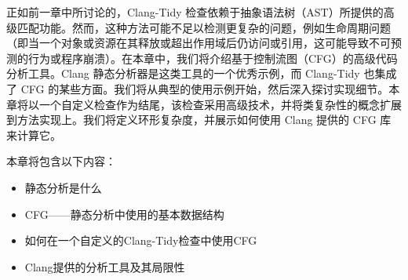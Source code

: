 
正如前一章中所讨论的，Clang-Tidy 检查依赖于抽象语法树（AST）所提供的高级匹配功能。然而，这种方法可能不足以检测更复杂的问题，例如生命周期问题（即当一个对象或资源在其释放或超出作用域后仍访问或引用，这可能导致不可预测的行为或程序崩溃）。在本章中，我们将介绍基于控制流图（CFG）的高级代码分析工具。Clang 静态分析器是这类工具的一个优秀示例，而 Clang-Tidy 也集成了 CFG 的某些方面。我们将从典型的使用示例开始，然后深入探讨实现细节。本章将以一个自定义检查作为结尾，该检查采用高级技术，并将类复杂性的概念扩展到方法实现上。我们将定义环形复杂度，并展示如何使用 Clang 提供的 CFG 库来计算它。

本章将包含以下内容：

\begin{itemize}
\item
静态分析是什么

\item
CFG——静态分析中使用的基本数据结构

\item
如何在一个自定义的Clang-Tidy检查中使用CFG

\item
Clang提供的分析工具及其局限性
\end{itemize}